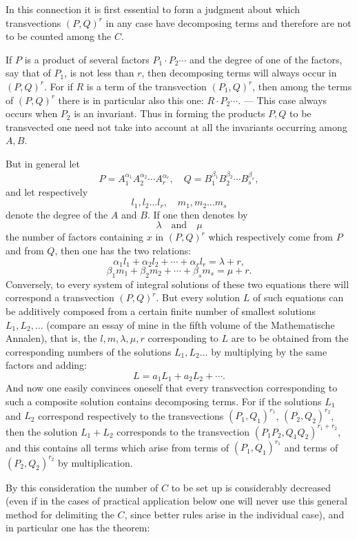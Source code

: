 \documentclass[10pt]{article}
\begin{document}
In this connection it is first essential to form a judgment about which transvections $(P,Q)^r$ in any case have decomposing terms and therefore are not to be counted among the $C$.

If $P$ is a product of several factors $P_1\cdot P_2\cdots$ and the degree of one of the factors, say that of $P_1$, is not less than $r$, then decomposing terms will always occur in $(P,Q)^r$. For if $R$ is a term of the transvection $(P_1,Q)^r$, then among the terms of $(P,Q)^r$ there is in particular also this one: $R\cdot P_2\cdots$. --- This case always occurs when $P_2$ is an invariant. Thus in forming the products $P,Q$ to be transvected one need not take into account at all the invariants occurring among $A,B$.

But in general let
\[
P=A_1^{\alpha_1}A_2^{\alpha_2}\cdots A_r^{\alpha_r},\quad
Q=B_1^{\beta_1}B_2^{\beta_2}\cdots B_s^{\beta_s},
\]
and let respectively
\[
l_1,l_2\ldots l_r,\quad m_1,m_2\ldots m_s
\]
denote the degree of the $A$ and $B$. If one then denotes by
\[
\lambda\quad\text{and}\quad \mu
\]
the number of factors containing $x$ in $(P,Q)^r$ which respectively come from $P$ and from $Q$, then one has the two relations:
\[
\alpha_1l_1+\alpha_2l_2+\cdots+\alpha_rl_r=\lambda+r,
\]
\[
\beta_1m_1+\beta_2m_2+\cdots+\beta_sm_s=\mu+r.
\]
Conversely, to every system of integral solutions of these two equations there will correspond a transvection $(P,Q)^r$. But every solution $L$ of such equations can be additively composed from a certain finite number of smallest solutions $L_1,L_2,\ldots$ (compare an essay of mine in the fifth volume of the Mathematische Annalen), that is, the $l,m,\lambda,\mu,r$ corresponding to $L$ are to be obtained from the corresponding numbers of the solutions $L_1,L_2\ldots$ by multiplying by the same factors and adding:
\[
L=a_1L_1+a_2L_2+\cdots.
\]
And now one easily convinces oneself that every transvection corresponding to such a composite solution contains decomposing terms. For if the solutions $L_1$ and $L_2$ correspond respectively to the transvections $(P_1,Q_1)^{r_1}$, $(P_2,Q_2)^{r_2}$, then the solution $L_1+L_2$ corresponds to the transvection $(P_1P_2,Q_1Q_2)^{r_1+r_2}$, and this contains all terms which arise from terms of $(P_1,Q_1)^{r_1}$ and terms of $(P_2,Q_2)^{r_2}$ by multiplication.

By this consideration the number of $C$ to be set up is considerably decreased (even if in the cases of practical application below one will never use this general method for delimiting the $C$, since better rules arise in the individual case), and in particular one has the theorem:
\end{document}
